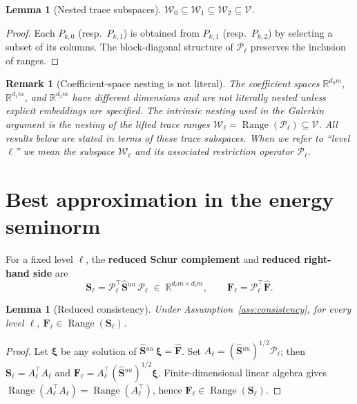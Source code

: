 \documentclass[11pt,a4paper]{article}
\newtheorem{lemma}[theorem]{Lemma}
\newtheorem{remark}[theorem]{Remark}
\theoremstyle{definition}
\newcommand{\R}{\mathbb{R}}
\newcommand{\Schur}{\mathbf{S}}
\newcommand{\Shatuu}{\widehat{\Schur}{}^{uu}}
\newcommand{\Fhat}{\widehat{\bm{F}}}
\newcommand{\Range}{\operatorname{Range}}
\newcommand{\Vspace}{\mathcal{V}}
\newcommand{\Wspace}{\mathcal{W}}
\newcommand{\Pcal}{\mathcal{P}}
\begin{document}
\begin{lemma}[Nested trace subspaces]\label{lem:nested}
  $\Wspace_0 \subseteq \Wspace_1 \subseteq \Wspace_2 \subseteq \Vspace$.
\end{lemma}

\begin{proof}
  Each $P_{k,0}$ (resp.\ $P_{k,1}$) is obtained from $P_{k,1}$
  (resp.\ $P_{k,2}$) by selecting a subset of its columns.
  The block-diagonal structure of $\Pcal_\ell$ preserves the inclusion
  of ranges.
\end{proof}

\begin{remark}[Coefficient-space nesting is not literal]\label{rem:coeff-nest}
  The coefficient spaces $\R^{d_0 m}$, $\R^{d_1 m}$, and $\R^{d_2 m}$
  have different dimensions and are not literally nested unless
  explicit embeddings are specified.  The intrinsic nesting used in
  the Galerkin argument is the nesting of the lifted trace ranges
  $\Wspace_\ell = \Range(\Pcal_\ell) \subseteq \Vspace$.
  All results below are stated in terms of these trace subspaces.
  When we refer to ``level $\ell$'' we mean the subspace $\Wspace_\ell$
  and its associated restriction operator $\Pcal_\ell$.
\end{remark}

\section{Best approximation in the energy seminorm}

For a fixed level $\ell$, the \textbf{reduced Schur complement} and
\textbf{reduced right-hand side} are
\begin{equation}\label{eq:S-ell}
  \Schur_\ell = \Pcal_\ell^\top \Shatuu\, \Pcal_\ell
  \;\in\; \R^{d_\ell m \times d_\ell m},\qquad
  \bm{F}_\ell = \Pcal_\ell^\top \Fhat.
\end{equation}

\begin{lemma}[Reduced consistency]\label{lem:reduced-cons}
  Under Assumption~\ref{ass:consistency}, for
  every level $\ell$,
  $\bm{F}_\ell \in \Range(\Schur_\ell)$.
\end{lemma}

\begin{proof}
  Let $\bm{\xi}$ be any solution of $\Shatuu\,\bm{\xi} = \Fhat$.
  Set $A_\ell = (\Shatuu)^{1/2}\Pcal_\ell$; then
  $\Schur_\ell = A_\ell^\top A_\ell$ and
  $\bm{F}_\ell = A_\ell^\top (\Shatuu)^{1/2}\bm{\xi}$.
  Finite-dimensional linear algebra gives
  $\Range(A_\ell^\top A_\ell) = \Range(A_\ell^\top)$,
  hence $\bm{F}_\ell \in \Range(\Schur_\ell)$.
\end{proof}
\end{document}
